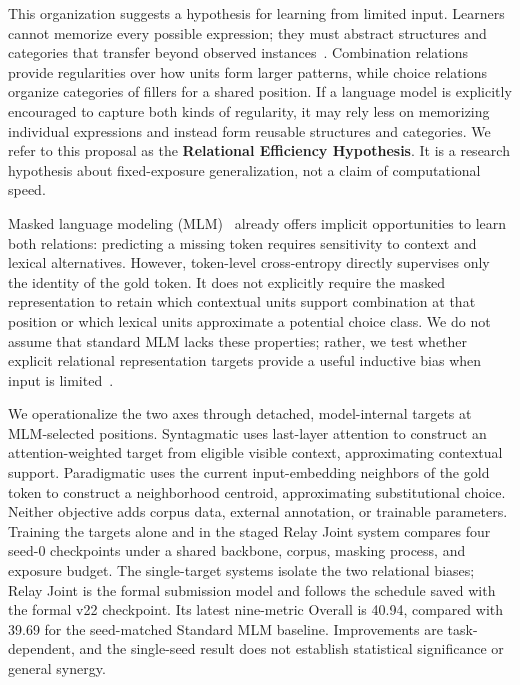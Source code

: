 \documentclass[11pt,a4paper]{article}
\newcommand{\syntagmatic}{Syntagmatic}
\newcommand{\paradigmatic}{Paradigmatic}
\newcommand{\relayjoint}{Relay Joint}
\begin{document}
This organization suggests a hypothesis for learning from limited
input. Learners cannot memorize every possible expression; they must
abstract structures and categories that transfer beyond observed
instances~\cite{tomasello2003constructing,bybee2010language}.
Combination relations provide regularities over how units form larger
patterns, while choice relations organize categories of fillers for a
shared position. If a language model is explicitly encouraged to
capture both kinds of regularity, it may rely less on memorizing
individual expressions and instead form reusable structures and
categories. We refer to this proposal as the \textbf{Relational
Efficiency Hypothesis}. It is a research hypothesis about
fixed-exposure generalization, not a claim of computational speed.

Masked language modeling (MLM)~\cite{devlin2019bert} already offers
implicit opportunities to learn both relations: predicting a missing
token requires sensitivity to context and lexical alternatives.
However, token-level cross-entropy directly supervises only the
identity of the gold token. It does not explicitly require the masked
representation to retain which contextual units support combination
at that position or which lexical units approximate a potential choice
class. We do not assume that standard MLM lacks these properties;
rather, we test whether explicit relational representation targets
provide a useful inductive bias when input is
limited~\cite{warstadt2023findings,hu2024babylm}.

We operationalize the two axes through detached, model-internal
targets at MLM-selected positions. \syntagmatic{} uses last-layer
attention to construct an attention-weighted target from eligible
visible context, approximating contextual support. \paradigmatic{}
uses the current input-embedding neighbors of the gold token to
construct a neighborhood centroid, approximating substitutional
choice. Neither objective adds corpus data, external annotation, or
trainable parameters. Training the targets alone and in the staged \relayjoint{} system
compares four seed-0 checkpoints under a shared backbone, corpus,
masking process, and exposure budget. The single-target systems isolate
the two relational biases; Relay Joint is the formal submission model
and follows the schedule saved with the formal v22 checkpoint.
Its latest nine-metric Overall is 40.94, compared with 39.69 for the
seed-matched Standard MLM baseline. Improvements are task-dependent,
and the single-seed result does not establish statistical significance
or general synergy.
\end{document}

